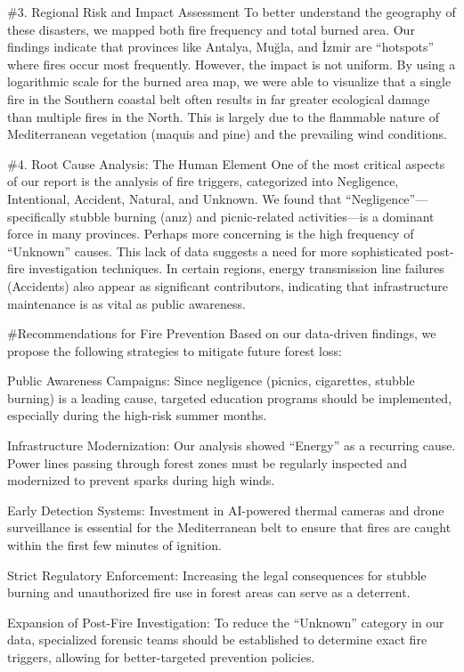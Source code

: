 \documentclass[
  11pt,
  a4paper,
  DIV=11,
  numbers=noendperiod]{scrartcl}
\begin{document}
\#3. Regional Risk and Impact Assessment To better understand the
geography of these disasters, we mapped both fire frequency and total
burned area. Our findings indicate that provinces like Antalya, Muğla,
and İzmir are ``hotspots'' where fires occur most frequently. However,
the impact is not uniform. By using a logarithmic scale for the burned
area map, we were able to visualize that a single fire in the Southern
coastal belt often results in far greater ecological damage than
multiple fires in the North. This is largely due to the flammable nature
of Mediterranean vegetation (maquis and pine) and the prevailing wind
conditions.

\#4. Root Cause Analysis: The Human Element One of the most critical
aspects of our report is the analysis of fire triggers, categorized into
Negligence, Intentional, Accident, Natural, and Unknown. We found that
``Negligence''---specifically stubble burning (anız) and picnic-related
activities---is a dominant force in many provinces. Perhaps more
concerning is the high frequency of ``Unknown'' causes. This lack of
data suggests a need for more sophisticated post-fire investigation
techniques. In certain regions, energy transmission line failures
(Accidents) also appear as significant contributors, indicating that
infrastructure maintenance is as vital as public awareness.

\#Recommendations for Fire Prevention Based on our data-driven findings,
we propose the following strategies to mitigate future forest loss:

Public Awareness Campaigns: Since negligence (picnics, cigarettes,
stubble burning) is a leading cause, targeted education programs should
be implemented, especially during the high-risk summer months.

Infrastructure Modernization: Our analysis showed ``Energy'' as a
recurring cause. Power lines passing through forest zones must be
regularly inspected and modernized to prevent sparks during high winds.

Early Detection Systems: Investment in AI-powered thermal cameras and
drone surveillance is essential for the Mediterranean belt to ensure
that fires are caught within the first few minutes of ignition.

Strict Regulatory Enforcement: Increasing the legal consequences for
stubble burning and unauthorized fire use in forest areas can serve as a
deterrent.

Expansion of Post-Fire Investigation: To reduce the ``Unknown'' category
in our data, specialized forensic teams should be established to
determine exact fire triggers, allowing for better-targeted prevention
policies.
\end{document}
